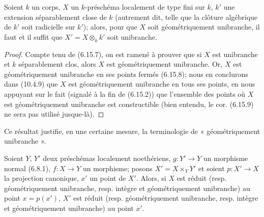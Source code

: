 \begin{corollary}[6.15.9]
\label{IV.2.s6.15.9-fr}
Soient $k$ un corps, $X$ un $k$-préschéma localement de type fini sur $k$,
$k'$ une extension séparablement close de $k$ (autrement dit, telle que la
clôture algébrique de $k'$ soit radicielle sur $k'$); alors, pour que $X$
soit géométriquement unibranche, il faut et il suffit que
$X'=X\otimes_k k'$ soit unibranche.
\end{corollary}

\begin{proof}
Compte tenu de (6.15.7), on est ramené à prouver que si $X$ est unibranche
et $k$ séparablement clos, alors $X$ est géométriquement unibranche. Or, $X$
est géométriquement unibranche en ses points fermés (6.15.8); nous en
conclurons dans (10.4.9) que $X$ est géométriquement unibranche en tous ses
points, en nous appuyant sur le fait (signalé à la fin de (6.15.2)) que
l'ensemble des points où $X$ est géométriquement unibranche est
constructible (bien entendu, le cor. (6.15.9) ne sera pas utilisé
jusque-là).
\end{proof}

Ce résultat justifie, en une certaine mesure, la terminologie de
« géométriquement unibranche ».

\begin{proposition}[6.15.10]
\label{IV.2.s6.15.10-fr}
Soient $Y$, $Y'$ deux préschémas localement noethériens, $g:Y'\to Y$ un
morphisme normal (6.8.1), $f:X\to Y$ un morphisme; posons
$X'=X\times_Y Y'$ et soient $p:X'\to X$ la projection canonique, $x'$ un
point de $X'$. Alors, si $X$ est réduit (resp. géométriquement unibranche,
resp. intègre et géométriquement unibranche) au point $x=p(x')$, $X'$ est
réduit (resp. géométriquement unibranche, resp. intègre et
géométriquement unibranche) au point $x'$.
\end{proposition}

